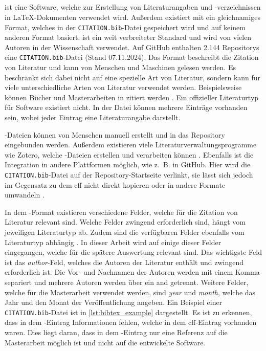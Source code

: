 \subsection{}
\label{subsec:bibtex_format}
 ist eine Software, welche zur Erstellung von Literaturangaben und -verzeichnissen in \LaTeX{}-Dokumenten verwendet wird.
Außerdem existiert mit  ein gleichnamiges Format, welches in der \texttt{CITATION.bib}-Datei gespeichert wird und auf keinem anderen Format basiert.
 ist ein weit verbreiteter Standard und wird von vielen Autoren in der Wissenschaft verwendet.
Auf GitHub enthalten 2.144 Repositorys eine \texttt{CITATION.bib}-Datei (Stand 07.11.2024).
Das Format beschreibt die Zitation von Literatur und kann von Menschen und Maschinen gelesen werden.
Es beschränkt sich dabei nicht auf eine spezielle Art von Literatur, sondern kann für viele unterschiedliche Arten von Literatur verwendet werden.
Beispielsweise können Bücher und Masterarbeiten in  zitiert werden \autocite{patashnik_bibtexing_1988}.
Ein offizieller Literaturtyp für Software existiert nicht.
In der Datei können mehrere Einträge vorhanden sein, wobei jeder Eintrag eine Literaturangabe darstellt.

-Dateien können von Menschen manuell erstellt und in das Repository eingebunden werden.
Außerdem existieren viele Literaturverwaltungsprogramme wie Zotero, welche -Dateien erstellen und verarbeiten können \autocite{zotero_zotero_2024}.
Ebenfalls ist die Integration in andere Plattformen möglich, wie z.~B. in GitHub.
Hier wird die \texttt{CITATION.bib}-Datei auf der Repository-Startseite verlinkt, sie lässt sich jedoch im Gegensatz zu dem \gls{cff} nicht direkt kopieren oder in andere Formate umwandeln \autocite{github_about_2024-1}.

In dem -Format existieren verschiedene Felder, welche für die Zitation von Literatur relevant sind.
Welche Felder zwingend erforderlich sind, hängt vom jeweiligen Literaturtyp ab.
Zudem sind die verfügbaren Felder ebenfalls vom Literaturtyp abhängig \autocite{patashnik_bibtexing_1988}.
In dieser Arbeit wird auf einige dieser Felder eingegangen, welche für die spätere Auswertung relevant sind.
Das wichtigste Feld ist das \emph{author}-Feld, welches die Autoren der Literatur enthält und zwingend erforderlich ist.
Die Vor- und Nachnamen der Autoren werden mit einem Komma separiert und mehrere Autoren werden über ein \glqq and\grqq{} getrennt.
Weitere Felder, welche für die Masterarbeit verwendet werden, sind \emph{year} und \emph{month}, welche das Jahr und den Monat der Veröffentlichung angeben.
Ein Beispiel einer \texttt{CITATION.bib}-Datei ist in \autoref{lst:bibtex_example} dargestellt.
Es ist zu erkennen, dass in dem -Eintrag Informationen fehlen, welche in dem \gls{cff}-Eintrag vorhanden waren.
Dies liegt daran, dass in dem -Eintrag nur eine Referenz auf die Masterarbeit möglich ist und nicht auf die entwickelte Software.


